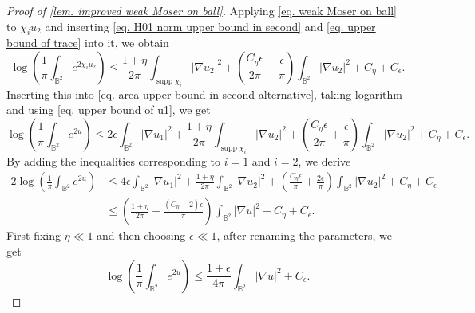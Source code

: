 \documentclass[11pt,a4paper,twoside]{amsart}
\newtheorem{sketch proof}{Sketch of the proof}[section]
\begin{document}
\begin{proof}[Proof of \cref{lem. improved weak Moser on ball}]
        Applying \cref{eq. weak Moser on ball} to $\chi_i u_2$ and inserting \cref{eq. H01 norm upper bound in second} and \cref{eq. upper bound of trace} into it, we obtain
        \[
        \log\left(
        \frac{1}{\pi}
        \int_{\mathbb{B}^2}e^{2\chi_i u_2}
        \right)
        \leq 
        \frac{1+\eta}{2\pi}
        \int_{\operatorname{supp}\chi_i}|\nabla u_2|^2
        +\left(\frac{C_\eta\epsilon}{2\pi}
        +\frac{\epsilon}{\pi}
        \right)
        \int_{\mathbb{B}^2}|\nabla u_2|^2
            +C_\eta+C_\epsilon.
        \]
        Inserting this into \cref{eq. area upper bound in second alternative}, taking logarithm and using \cref{eq. upper bound of u1}, we get 
        \[
        \log\left(
        \frac{1}{\pi}
        \int_{\mathbb{B}^2}e^{2u}
        \right)
        \leq
        2\epsilon\int_{\mathbb{B}^2}
        |\nabla u_1|^2
        +\frac{1+\eta}{2\pi}
        \int_{\operatorname{supp}\chi_i}|\nabla u_2|^2
        +\left(\frac{C_\eta\epsilon}{2\pi}
        +\frac{\epsilon}{\pi}
        \right)
        \int_{\mathbb{B}^2}|\nabla u_2|^2
        +C_\eta+C_\epsilon.
        \]
        By adding the inequalities corresponding to $i=1$ and $i=2$, we derive
        \begin{align*}
            2\log\left(
        \frac{1}{\pi}
        \int_{\mathbb{B}^2}e^{2u}
        \right)
        &\leq
        4\epsilon\int_{\mathbb{B}^2}
        |\nabla u_1|^2
        +\frac{1+\eta}{2\pi}
        \int_{\mathbb{B}^2}|\nabla u_2|^2
        +\left(\frac{C_\eta\epsilon}{\pi}
        +\frac{2\epsilon}{\pi}
        \right)
        \int_{\mathbb{B}^2}|\nabla u_2|^2
        +C_\eta+C_\epsilon\\[3mm]
        &\leq 
        \left(
        \frac{1+\eta}{2\pi}
        +\frac{(C_\eta+2)\epsilon}{\pi}
        \right)
        \int_{\mathbb{B}^2}|\nabla u|^2
        +C_\eta+C_\epsilon.
        \end{align*}
        First fixing $\eta\ll 1$ and then choosing $\epsilon\ll 1$, after renaming the parameters, we get
        \[
        \log\left(
        \frac{1}{\pi}
        \int_{\mathbb{B}^2}e^{2u}
        \right)
        \leq \frac{1+\epsilon}{4\pi}
        \int_{\mathbb{B}^2}|\nabla u|^2
        +C_\epsilon.
        \] 


\end{proof}
\end{document}
